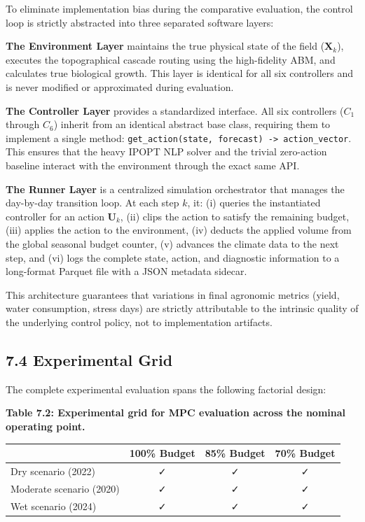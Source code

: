 To eliminate implementation bias during the comparative evaluation, the
control loop is strictly abstracted into three separated software
layers:

\textbf{The Environment Layer} maintains the true physical state of the
field (\(\mathbf{X}_k\)), executes the topographical cascade routing
using the high-fidelity ABM, and calculates true biological growth. This
layer is identical for all six controllers and is never modified or
approximated during evaluation.

\textbf{The Controller Layer} provides a standardized interface. All six
controllers (\(C_1\) through \(C_6\)) inherit from an identical abstract
base class, requiring them to implement a single method:
\texttt{get\_action(state,\ forecast)\ -\textgreater{}\ action\_vector}.
This ensures that the heavy IPOPT NLP solver and the trivial zero-action
baseline interact with the environment through the exact same API.

\textbf{The Runner Layer} is a centralized simulation orchestrator that
manages the day-by-day transition loop. At each step \(k\), it: (i)
queries the instantiated controller for an action \(\mathbf{U}_k\), (ii)
clips the action to satisfy the remaining budget, (iii) applies the
action to the environment, (iv) deducts the applied volume from the
global seasonal budget counter, (v) advances the climate data to the
next step, and (vi) logs the complete state, action, and diagnostic
information to a long-format Parquet file with a JSON metadata sidecar.

This architecture guarantees that variations in final agronomic metrics
(yield, water consumption, stress days) are strictly attributable to the
intrinsic quality of the underlying control policy, not to
implementation artifacts.

\subsection{7.4 Experimental Grid}\label{experimental-grid}

The complete experimental evaluation spans the following factorial
design:

\textbf{Table 7.2: Experimental grid for MPC evaluation across the
nominal operating point.}

\begin{longtable}[]{@{}lccc@{}}
\toprule\noalign{}
& 100\% Budget & 85\% Budget & 70\% Budget \\
\midrule\noalign{}
\endhead
\bottomrule\noalign{}
\endlastfoot
Dry scenario (2022) & ✓ & ✓ & ✓ \\
Moderate scenario (2020) & ✓ & ✓ & ✓ \\
Wet scenario (2024) & ✓ & ✓ & ✓ \\
\end{longtable}

